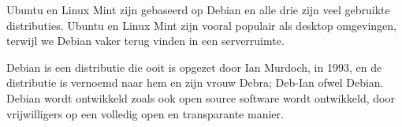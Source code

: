 Ubuntu en Linux Mint zijn gebaseerd op Debian en alle drie zijn veel gebruikte distributies. Ubuntu en Linux Mint zijn vooral populair als desktop omgevingen, terwijl we Debian vaker terug vinden in een serverruimte.

Debian is een distributie die ooit is opgezet door Ian Murdoch, in 1993, en de distributie is vernoemd naar hem en zijn vrouw Debra; Deb-Ian ofwel Debian. Debian wordt ontwikkeld zoals ook open source software wordt ontwikkeld, door vrijwilligers op een volledig open en transparante manier.

